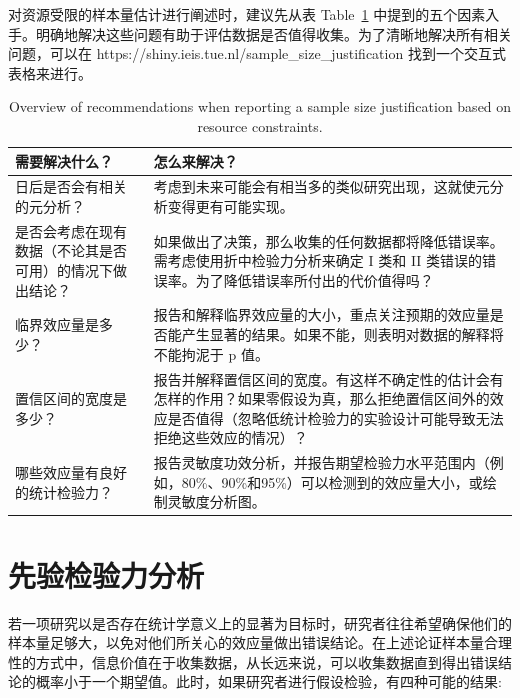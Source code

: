 \documentclass[
  letterpaper,
  DIV=11,
  numbers=noendperiod]{scrreprt}
\begin{document}
对资源受限的样本量估计进行阐述时，建议先从表
Table~\ref{tbl-table-pow-rec}
中提到的五个因素入手。明确地解决这些问题有助于评估数据是否值得收集。为了清晰地解决所有相关问题，可以在
https://shiny.ieis.tue.nl/sample\_size\_justification
找到一个交互式表格来进行。

\hypertarget{tbl-table-pow-rec}{}
\begin{table}
\caption{\label{tbl-table-pow-rec}Overview of recommendations when reporting a sample size justification
based on resource constraints. }\tabularnewline

\centering
\begin{tabular}{>{\raggedright\arraybackslash}p{5cm}|>{\raggedright\arraybackslash}p{10cm}}
\hline
需要解决什么？ & 怎么来解决？\\
\hline
日后是否会有相关的元分析？ & 考虑到未来可能会有相当多的类似研究出现，这就使元分析变得更有可能实现。\\
\hline
是否会考虑在现有数据（不论其是否可用）的情况下做出结论？ & 如果做出了决策，那么收集的任何数据都将降低错误率。需考虑使用折中检验力分析来确定 I 类和 II 类错误的错误率。为了降低错误率所付出的代价值得吗？\\
\hline
临界效应量是多少？ & 报告和解释临界效应量的大小，重点关注预期的效应量是否能产生显著的结果。如果不能，则表明对数据的解释将不能拘泥于 p 值。\\
\hline
置信区间的宽度是多少？ & 报告并解释置信区间的宽度。有这样不确定性的估计会有怎样的作用？如果零假设为真，那么拒绝置信区间外的效应是否值得（忽略低统计检验力的实验设计可能导致无法拒绝这些效应的情况）？\\
\hline
哪些效应量有良好的统计检验力？ & 报告灵敏度功效分析，并报告期望检验力水平范围内（例如，80\%、90\%和95\%）可以检测到的效应量大小，或绘制灵敏度分析图。\\
\hline
\end{tabular}
\end{table}

\hypertarget{sec-aprioripower}{%
\section{先验检验力分析}\label{sec-aprioripower}}

若一项研究以是否存在统计学意义上的显著为目标时，研究者往往希望确保他们的样本量足够大，以免对他们所关心的效应量做出错误结论。在上述论证样本量合理性的方式中，信息价值在于收集数据，从长远来说，可以收集数据直到得出错误结论的概率小于一个期望值。此时，如果研究者进行假设检验，有四种可能的结果:
\end{document}
